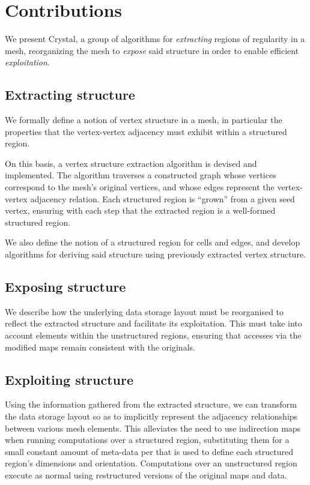 \section{Contributions}

We present Crystal, a group of algorithms for \emph{extracting} regions of regularity in a mesh, reorganizing the mesh to \emph{expose} said structure in order to enable efficient \emph{exploitation}.




\subsection{Extracting structure}
We formally define a notion of vertex structure in a mesh, in particular the properties that the vertex-vertex adjacency must exhibit within a structured region.


On this basis, a vertex structure extraction algorithm is devised and implemented. The algorithm traverses a constructed graph whose vertices correspond to the mesh's original vertices, and whose edges represent the vertex-vertex adjacency relation. Each structured region is ``grown'' from a given seed vertex, ensuring with each step that the extracted region is a well-formed structured region.

We also define the notion of a structured region for cells and edges, and develop algorithms for deriving said structure using previously extracted vertex structure.


\subsection{Exposing structure}
We describe how the underlying data storage layout must be reorganised to reflect the extracted structure and facilitate its exploitation. This must take into account elements within the unstructured regions, ensuring that accesses via the modified maps remain consistent with the originals.

\subsection{Exploiting structure}
Using the information gathered from the extracted structure, we can transform the data storage layout so as to implicitly represent the adjacency relationships between various mesh elements. This alleviates the need to use indirection maps when running computations over a structured region, substituting them for a small constant amount of meta-data per that is used to define each structured region's dimensions and orientation. Computations over an unstructured region execute as normal using restructured versions of the original maps and data.

